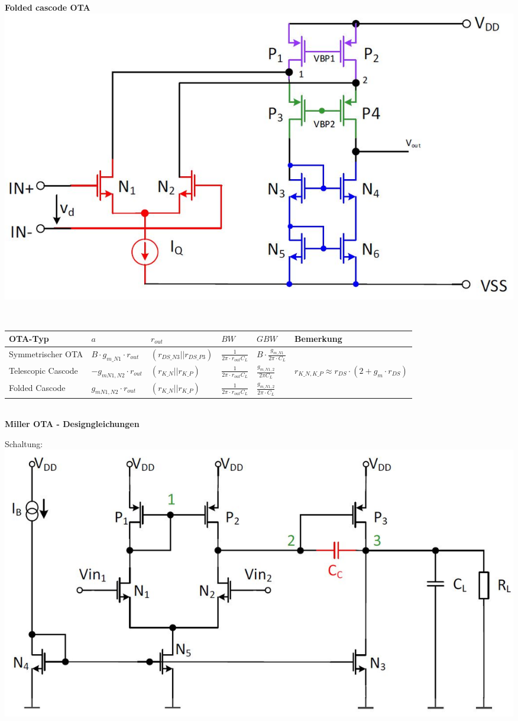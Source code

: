 \begin{minipage}[t]{0.5\textwidth}
	\textbf{Folded cascode OTA}\\
	\includegraphics[width=0.7\linewidth]{chapters/OTA/images/FoldedCascodeOTA}\\
\end{minipage}\\
\begin{tabular}{|l|p{3cm}|l|l|l|p{3cm}|}
	\hline
	OTA-Typ&$a$&$r_{out}$&$BW$&$GBW$&Bemerkung\\ \hline
	Symmetrischer OTA&$B\cdot g_{m\_N1}\cdot r_{out}$&$(r_{DS\_N3}||r_{DS\_P3})$&$\frac{1}{2\pi\cdot r_{out}C_L}$&$B\cdot\frac{g_{m\_N1}}{2\pi\cdot C_L}$& \\ \hline
	Telescopic Cascode&$-g_{mN1,N2} \cdot r_{out}$&$(r_{K\_N}||r_{K\_P})$&$\frac{1}{2\pi\cdot r_{out}C_L}$&$\frac{g_{m\_N1,2}}{2\pi C_L}$&$r_{K\_N,K\_P}\approx r_{DS}\cdot(2+g_m\cdot r_{DS})$\\ \hline
	Folded Cascode&$g_{mN1,N2}\cdot r_{out}$&$(r_{K\_N}||r_{K\_P})$&$\frac{1}{2\pi\cdot r_{out}C_L}$&$\frac{g_{m\_N1,2}}{2\pi\cdot C_L}$&\\ \hline
	
\end{tabular}\\[2ex]
\textbf{Miller OTA - Designgleichungen}\\
\begin{minipage}[t]{0.3\textwidth}
	Schaltung:\\
	\includegraphics[width=1\linewidth]{chapters/OTA/images/MillerOTA}
\end{minipage}
